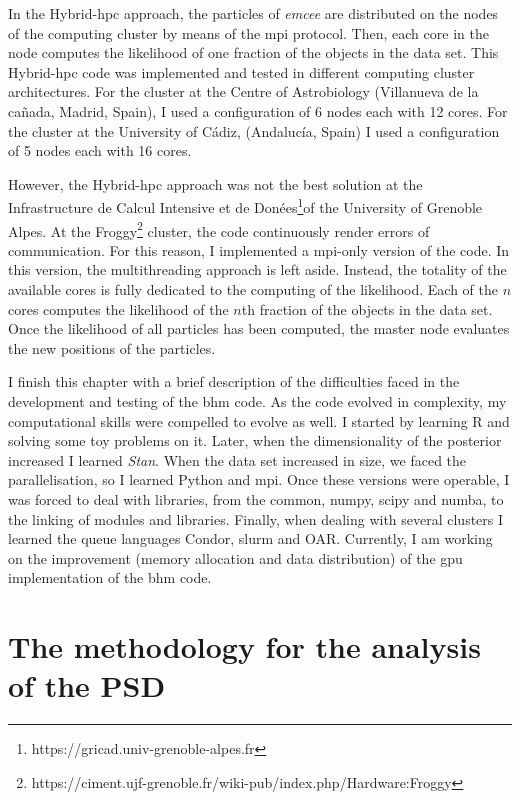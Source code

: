 In the Hybrid-\gls{hpc} approach, the particles of \emph{emcee} are distributed on the nodes of the computing cluster by means of the \gls{mpi} protocol. Then, each core in the node computes the likelihood of one fraction of the objects in the data set. This Hybrid-\gls{hpc} code was implemented and tested in different computing cluster architectures. For the cluster at the Centre of Astrobiology (Villanueva de la ca\~nada, Madrid, Spain), I used a configuration of 6 nodes each with 12 cores. For the cluster at the University of C\'adiz, (Andalucía, Spain) I used a configuration of 5 nodes each with 16 cores.

However, the  Hybrid-\gls{hpc} approach was not the best solution at the Infrastructure de Calcul Intensive et de Donées\footnote{https://gricad.univ-grenoble-alpes.fr}of the University of Grenoble Alpes. At the Froggy\footnote{https://ciment.ujf-grenoble.fr/wiki-pub/index.php/Hardware:Froggy} cluster, the code continuously render errors of communication. For this reason, I implemented a \gls{mpi}-only version of the code. In this version, the multithreading approach is left aside. Instead, the totality of the available cores is fully dedicated to the computing of the likelihood. Each of the $n$ cores computes the likelihood of the $n$th fraction of the objects in the data set. Once the likelihood of all particles has been computed, the master node evaluates the new positions of the particles.

I finish this chapter with a brief description of the difficulties faced in the development and testing of the \gls{bhm} code. As the code evolved in complexity, my computational skills were compelled to evolve as well. I started by learning R and solving some toy problems on it. Later, when the dimensionality of the posterior increased I learned \emph{Stan}. When the data set increased in size, we faced the parallelisation, so I learned Python and \gls{mpi}. Once these versions were operable, I was forced to deal with libraries, from the common, numpy, scipy and numba, to the linking of modules and libraries. Finally, when dealing with several clusters I learned the queue languages Condor, slurm and OAR. Currently, I am working on the improvement (memory allocation and data distribution) of the \gls{gpu} implementation of the \gls{bhm} code.  

\section{The methodology for the analysis of the PSD}
\label{sect:PSDmethod}

